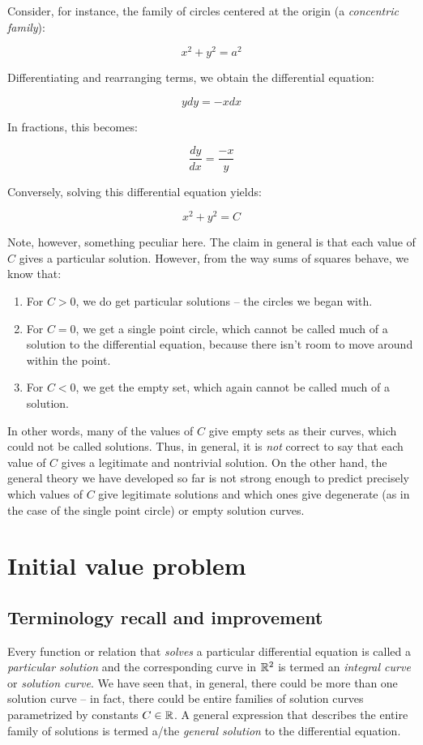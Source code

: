 \documentclass{amsart}
\begin{document}
Consider, for instance, the family of circles centered at the origin
(a {\em concentric family}):

$$x^2 + y^2 = a^2$$

Differentiating and rearranging terms, we obtain the differential equation:

$$ydy = -xdx$$

In fractions, this becomes:

$$\frac{dy}{dx} = \frac{-x}{y}$$

Conversely, solving this differential equation yields:

$$x^2 + y^2 = C$$

Note, however, something peculiar here. The claim in general is that
each value of $C$ gives a particular solution. However, from the way
sums of squares behave, we know that:

\begin{enumerate}
\item For $C > 0$, we do get particular solutions -- the circles we
  began with.
\item For $C = 0$, we get a single point circle, which cannot be
  called much of a solution to the differential equation, because
  there isn't room to move around within the point.
\item For $C < 0$, we get the empty set, which again cannot be called
  much of a solution.
\end{enumerate}

In other words, many of the values of $C$ give empty sets as their
curves, which could not be called solutions. Thus, in general, it is
{\em not} correct to say that each value of $C$ gives a legitimate and
nontrivial solution. On the other hand, the general theory we have
developed so far is not strong enough to predict precisely which
values of $C$ give legitimate solutions and which ones give degenerate
(as in the case of the single point circle) or empty solution curves.

\section{Initial value problem}

\subsection{Terminology recall and improvement}

Every function or relation that {\em solves} a particular differential
equation is called a {\em particular solution} and the corresponding
curve in $\mathbb{R}^2$ is termed an {\em integral curve} or {\em solution
curve}. We have seen that, in general, there could be more than one
solution curve -- in fact, there could be entire families of solution
curves parametrized by constants $C \in \mathbb{R}$. A general expression that
describes the entire family of solutions is termed a/the {\em general
solution} to the differential equation.
\end{document}
